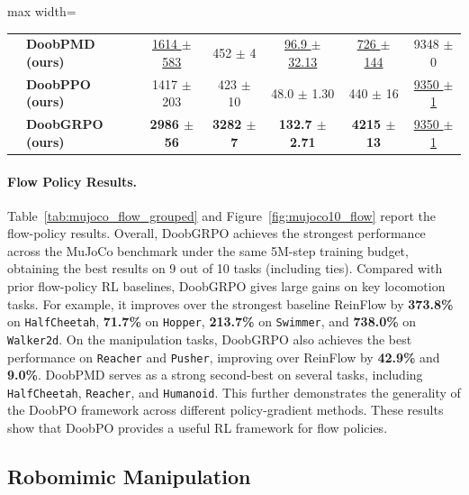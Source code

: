 \begin{table}[t]
\begin{adjustbox}{max width=\textwidth}
\begin{tabular}{llccccc}
& \textbf{DoobPMD (ours)}
& \underline{1614 $\pm$ 583}
& 452 $\pm$ 4
& \underline{96.9 $\pm$ 32.13}
& \underline{726 $\pm$ 144}
& 9348 $\pm$ 0 \\

& \textbf{DoobPPO (ours)}
& 1417 $\pm$ 203
& 423 $\pm$ 10
& 48.0 $\pm$ 1.30
& 440 $\pm$ 16
& \underline{9350 $\pm$ 1} \\

& \textbf{DoobGRPO (ours)}
& \textbf{2986 $\pm$ 56}
& \textbf{3282 $\pm$ 7}
& \textbf{132.7 $\pm$ 2.71}
& \textbf{4215 $\pm$ 13}
& \underline{9350 $\pm$ 1} \\

\bottomrule
\end{tabular}
\end{adjustbox}
\end{table}

\paragraph{Flow Policy Results.}
Table~\ref{tab:mujoco_flow_grouped} and Figure~\ref{fig:mujoco10_flow} report the flow-policy results.
Overall, DoobGRPO achieves the strongest performance across the MuJoCo benchmark under the same 5M-step training budget, obtaining the best results on 9 out of 10 tasks (including ties).
Compared with prior flow-policy RL baselines, DoobGRPO gives large gains on key locomotion tasks.
For example, it improves over the strongest baseline ReinFlow by \textbf{373.8\%} on \texttt{HalfCheetah}, \textbf{71.7\%} on \texttt{Hopper}, \textbf{213.7\%} on \texttt{Swimmer}, and \textbf{738.0\%} on \texttt{Walker2d}.
On the manipulation tasks, DoobGRPO also achieves the best performance on \texttt{Reacher} and \texttt{Pusher}, improving over ReinFlow by \textbf{42.9\%} and \textbf{9.0\%}.
DoobPMD serves as a strong second-best on several tasks, including \texttt{HalfCheetah}, \texttt{Reacher}, and \texttt{Humanoid}.
This further demonstrates the generality of the DoobPO framework across different policy-gradient methods.
These results show that DoobPO provides a useful RL framework for flow policies.

\subsection{Robomimic Manipulation}
\label{sec:robomimic_exp}

